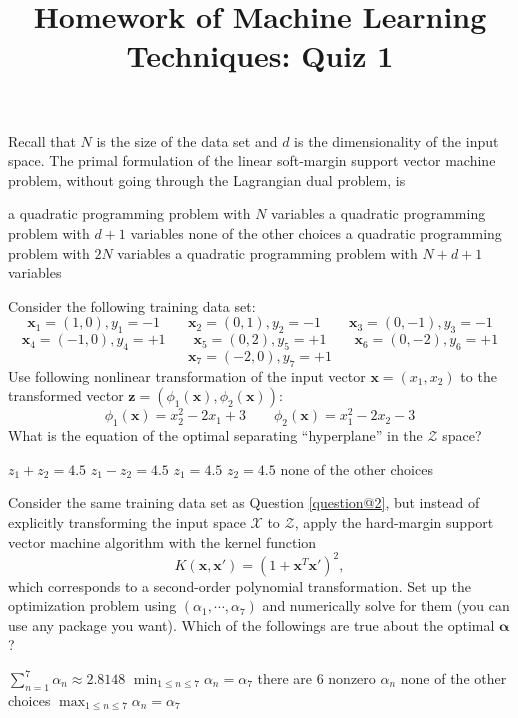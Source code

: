 \documentclass[a4paper,10pt]{exam}
\title{Homework of Machine Learning Techniques: Quiz 1}
\date{}
\author{}
\begin{document}
	\maketitle
\begin{questions}
	 \question Recall that $N$ is the size of the data set and $d$ is the dimensionality of the input space. The primal formulation of the linear soft-margin support vector machine problem, without going through the Lagrangian dual problem, is
	 \begin{checkboxes}
	 	\choice a quadratic programming problem with $N$ variables
	 	\choice a quadratic programming problem with $d+1$ variables
	 	\choice none of the other choices
	 	\choice a quadratic programming problem with $2N$ variables
	 	\CorrectChoice a quadratic programming problem with $N+d+1$ variables
	 \end{checkboxes}
	 
	 \question Consider the following training data set:
	 \[\mathbf{x}_1 = (1, 0), y_1 = -1 \quad \quad \mathbf{x}_2 = (0, 1), y_2 = -1 \quad \quad \mathbf{x}_3 = (0,-1), y_3=-1\]
	 \[\mathbf{x}_4 = (-1, 0), y_4 = +1 \quad \quad \mathbf{x}_5 = (0, 2), y_5 = +1 \quad \quad \mathbf{x}_6 = (0,-2), y_6=+1\]
	 \[\mathbf{x}_7 = (-2, 0), y_7 = +1\]
	 Use following nonlinear transformation of the input vector $\mathbf{x} = (x_1, x_2)$ to the transformed vector $\mathbf{z} = (\phi_1(\mathbf{x}), \phi_2(\mathbf{x}))$:
	 \[\phi_1(\mathbf{x}) = x_2^2 - 2x_1 + 3 \quad \quad \phi_2(\mathbf{x}) = x_1^2 - 2 x_2 - 3\]
	 What is the equation of the optimal separating ``hyperplane'' in the $\mathcal{Z}$ space?
	 \begin{checkboxes}
	 	\choice $z_1 + z_2 = 4.5$
	 	\choice $z_1 - z_2 = 4.5$
	 	\CorrectChoice $z_1 = 4.5$
	 	\choice $z_2 = 4.5$
	 	\choice none of the other choices
	 \end{checkboxes}
	 
	 \question Consider the same training data set as Question \ref{question@2}, but instead of explicitly transforming the input space $\mathcal{X}$ to $\mathcal{Z}$, apply the hard-margin support vector machine algorithm with the kernel function
	 \[K(\mathbf{x}, \mathbf{x}') = (1 + \mathbf{x}^T \mathbf{x}')^2,\]
	 which corresponds to a second-order polynomial transformation. Set up the optimization problem using $(\alpha_1, \cdots, \alpha_7)$ and numerically solve for them (you can use any package you want). Which of the followings are true about the optimal ${\boldsymbol\alpha}$?
	 \begin{checkboxes}
	 	\CorrectChoice $\sum_{n=1}^7 \alpha_n \approx 2.8148$
	 	\CorrectChoice $\min_{1 \le n \le 7} \alpha_n = \alpha_7$
	 	\choice there are 6 nonzero $\alpha_n$
	 	\choice none of the other choices
	 	\choice $\max_{1 \le n \le 7} \alpha_n = \alpha_7$
	 \end{checkboxes}
	 

\end{questions}
\end{document}
